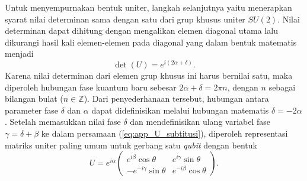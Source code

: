Untuk menyempurnakan bentuk uniter, langkah selanjutnya yaitu menerapkan syarat nilai determinan sama dengan satu dari grup khusus uniter $SU(2)$. Nilai determinan dapat dihitung dengan mengalikan elemen diagonal utama lalu dikurangi hasil kali elemen-elemen pada diagonal yang dalam bentuk matematis menjadi
\begin{equation}
\det(U) = e^{i(2\alpha+\delta)}.
\end{equation}
Karena nilai determinan dari elemen grup khusus ini harus bernilai satu, maka diperoleh hubungan fase kuantum baru sebesar $2\alpha+\delta=2\pi n$, dengan $n$ sebagai bilangan bulat ($n \in \mathbb{Z}$). Dari penyederhanaan tersebut, hubungan antara parameter fase $\delta$ dan $\alpha$ dapat didefinisikan melalui hubungan matematis $\delta = -2\alpha$. Setelah memasukkan nilai fase $\delta$ dan mendefinisikan ulang variabel fase $\gamma = \delta + \beta$ ke dalam persamaan (\ref{eq:app_U_subtitusi}), diperoleh representasi matriks uniter paling umum untuk gerbang satu \textit{qubit} dengan bentuk
\begin{equation}
\label{eq:app_unitary_general}
U = e^{i\alpha} \begin{pmatrix} e^{i\beta}\cos\theta & e^{i\gamma}\sin\theta \\ -e^{-i\gamma}\sin\theta & e^{-i\beta}\cos\theta \end{pmatrix}.
\end{equation}
